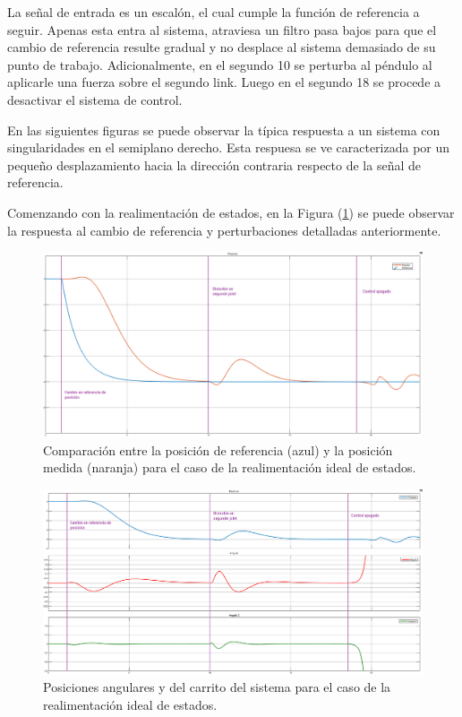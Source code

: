 %
%
%
La señal de entrada es un escalón, el cual cumple la función de referencia a seguir. Apenas esta entra al sistema, atraviesa un filtro pasa bajos para que el cambio de referencia resulte gradual y no desplace al sistema demasiado de su punto de trabajo.
Adicionalmente, en el segundo 10 se perturba al péndulo al aplicarle una fuerza sobre el segundo link. Luego en el segundo 18 se procede a desactivar el sistema de control.

En las siguientes figuras se puede observar la típica respuesta a un sistema con singularidades en el semiplano derecho. Esta respuesa se ve caracterizada por un pequeño desplazamiento hacia la dirección contraria respecto de la señal de referencia.

Comenzando con la realimentación de estados, en la Figura (\ref{fig:realim_posref}) se puede observar la respuesta al cambio de referencia y perturbaciones detalladas anteriormente.

\begin{figure}[H]
	\centering
	\includegraphics[width=\linewidth]{../Analisis de Resultados/ImagenesAnalisis de Resultados/realim_posref.png}
	\caption{Comparación entre la posición de referencia (azul) y la posición medida (naranja) para el caso de la realimentación ideal de estados.}	
	\label{fig:realim_posref}
\end{figure}

\begin{figure}[H]
	\centering
	\includegraphics[width=\linewidth]{../Analisis de Resultados/ImagenesAnalisis de Resultados/realim_vars.png}
	\caption{Posiciones angulares y del carrito del sistema para el caso de la realimentación ideal de estados.}	
	\label{fig:realim_vars}
\end{figure}

